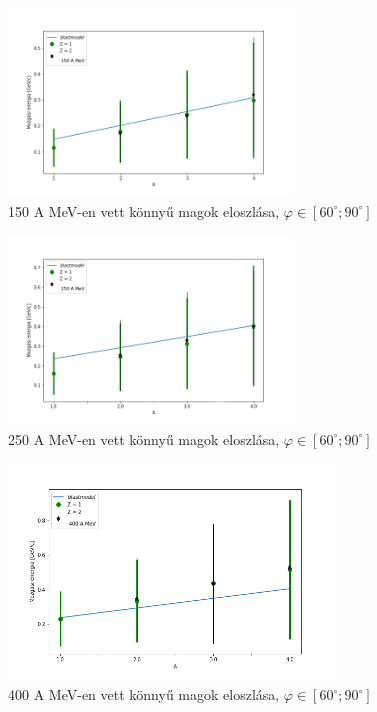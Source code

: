 \documentclass[a4paper,12pt]{article}
\begin{document}
\begin{figure}[H]
\begin{minipage}{\textwidth}
\centering
\includegraphics[width=0.67\textwidth]{./konnyu_magok_150AMeV.png}
\caption{150 A MeV-en vett könnyű magok eloszlása, $\varphi \in [60^{\circ};90^{\circ}]$}
\end{minipage}
\end{figure}
\begin{figure}[H]
\begin{minipage}{\textwidth}
\centering
\includegraphics[width=0.67\textwidth]{./konnyu_magok_250AMeVupdate.png}
\caption{250 A MeV-en vett könnyű magok eloszlása, $\varphi \in [60^{\circ};90^{\circ}]$}
\end{minipage}
\end{figure}
\begin{figure}[H]
\begin{minipage}{\textwidth}
\centering
\includegraphics[width=0.77\textwidth]{./konnyu_magok_400AMeVupdate.png}
\caption{400 A MeV-en vett könnyű magok eloszlása, $\varphi \in [60^{\circ};90^{\circ}]$}
\end{minipage}
\end{figure}
\end{document}

